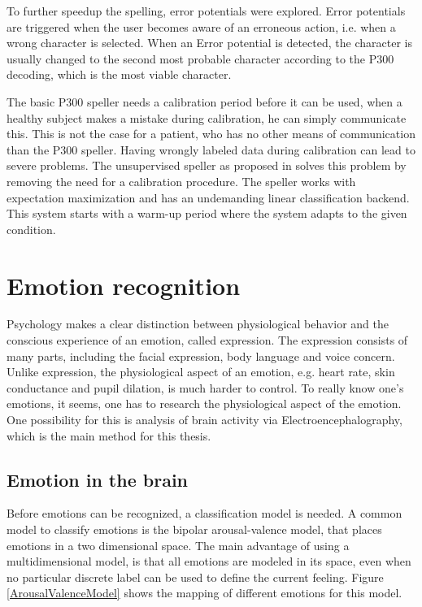 To further speedup the spelling, error potentials were explored. Error potentials are triggered when the user becomes aware of an erroneous action\cite{ErrorPotentials}, i.e. when a wrong character is selected. When an Error potential is detected, the character is usually changed to the second most probable character according to the P300 decoding\cite{ErrSecChar}, which is the most viable character.

\npar

The basic P300 speller needs a calibration period before it can be used, when a healthy subject makes a mistake during calibration, he can simply communicate this. This is not the case for a patient, who has no other means of communication than the P300 speller. Having wrongly labeled data during calibration can lead to severe problems. The unsupervised speller as proposed in \cite{P300Unsupervised} solves this problem by removing the need for a calibration procedure. The speller works with expectation maximization and has an undemanding linear classification backend. This system starts with a warm-up period where the system adapts to the given condition.

\section{Emotion recognition}

Psychology makes a clear distinction between physiological behavior and the conscious experience of an emotion, called expression\cite{ExtendedPaper}. The expression consists of many parts, including the facial expression, body language and voice concern. Unlike expression, the physiological aspect of an emotion, e.g. heart rate, skin conductance and pupil dilation, is much harder to control. To really know one's emotions, it seems, one has to research the physiological aspect of the emotion. One possibility for this is analysis of brain activity via Electroencephalography\cite{EEGDatasets}, which is the main method for this thesis.


\subsection{Emotion in the brain}
\label{valarrdomspace}

Before emotions can be recognized, a classification model is needed. A common model to classify emotions is the bipolar arousal-valence model\cite{ExtendedPaper,RealTimeEEGEmotion}, that places emotions in a two dimensional space. The main advantage of using a multidimensional model, is that all emotions are modeled in its space, even when no particular discrete label can be used to define the current feeling. Figure \ref{ArousalValenceModel} shows the mapping of different emotions for this model. 

